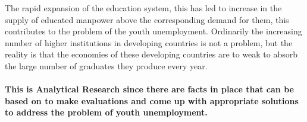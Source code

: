 \documentclass[10pt,a4paper]{article}
\begin{document}
\begin{flushleft}
The rapid expansion of the education system, this has led to increase in the supply of educated manpower above the corresponding demand for them, this  contributes to the problem of the youth unemployment. Ordinarily the increasing number of higher institutions in developing countries is not a problem, but the reality is that the economies of these developing countries are to weak to absorb the large number of graduates they produce every year. \newline 
\end{flushleft}
\paragraph{This is \textbf{Analytical Research} since there are facts in place that can be based on to make evaluations and come up with appropriate solutions to address the problem of youth unemployment.}
\end{document}
